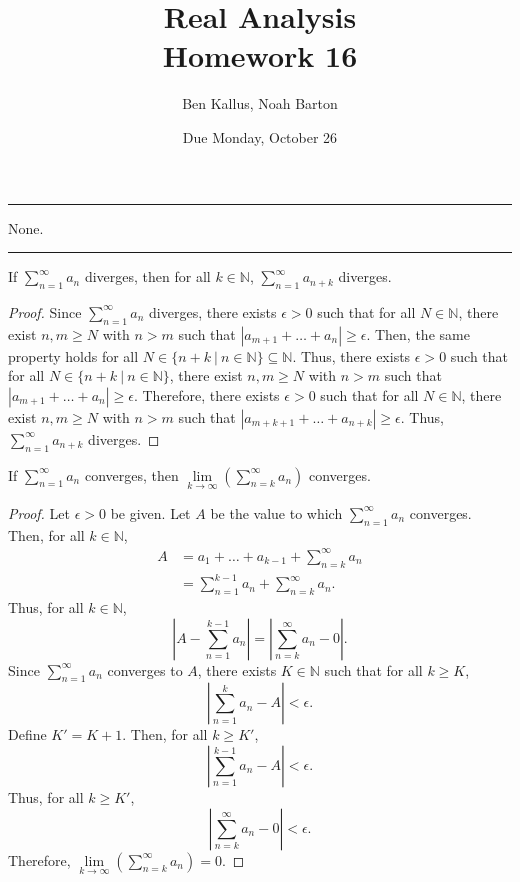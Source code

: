 \documentclass[12pt]{article}
\title{Real Analysis \\ Homework 16}
\author{Ben Kallus, Noah Barton}
\date{Due Monday, October 26}
\begin{document}
\pagecolor{black}
\color{white}
\maketitle

\hrule
\bigskip

 None.

\bigskip
\hrule
\bigskip

 If $\sum\limits_{n=1}^\infty a_n$ diverges, then for all $k \in \mathbb N$, $\sum\limits_{n=1}^\infty a_{n+k}$ diverges.
\begin{proof}
    Since $\sum\limits_{n=1}^\infty a_n$ diverges, there exists $\epsilon > 0$ such that for all $N \in \mathbb N$, there exist $n,m \geq N$ with $n > m$ such that $|a_{m+1} + \hdots + a_n| \geq \epsilon$. Then, the same property holds for all $N \in \{n+k~|~n \in \mathbb N\} \subseteq \mathbb N$. Thus, there exists $\epsilon > 0$ such that for all $N \in \{n+k~|~n \in \mathbb N\}$, there exist $n,m \geq N$ with $n > m$ such that $|a_{m+1} + \hdots + a_n| \geq \epsilon$. Therefore, there exists $\epsilon > 0$ such that for all $N \in \mathbb N$, there exist $n,m \geq N$ with $n > m$ such that $|a_{m+k+1} + \hdots + a_{n+k}| \geq \epsilon$. Thus, $\sum\limits_{n=1}^\infty a_{n+k}$ diverges.
\end{proof}

\newpage
{} If $\sum\limits_{n=1}^\infty a_n$ converges, then $\lim\limits_{k\to\infty} \left( \sum\limits_{n=k}^\infty a_n \right)$ converges.
\begin{proof}
    Let $\epsilon > 0$ be given. Let $A$ be the value to which $\sum\limits_{n=1}^\infty a_n$ converges. Then, for all $k \in \mathbb N$,
    \begin{align*}
        A &= a_1 + \hdots + a_{k-1} + \sum\limits_{n=k}^\infty a_n \\
          &= \sum\limits_{n=1}^{k-1} a_n + \sum\limits_{n=k}^\infty a_n.
    \end{align*}
    Thus, for all $k \in \mathbb N$, $$\left|A - \sum\limits_{n=1}^{k-1} a_n\right| = \left|\sum\limits_{n=k}^\infty a_n - 0\right|.$$ Since $\sum\limits_{n=1}^\infty a_n$ converges to $A$, there exists $K \in \mathbb N$ such that for all $k \geq K$, $$\left| \sum_{n=1}^k a_n - A\right| < \epsilon.$$
    Define $K' = K + 1$. Then, for all $k \geq K'$, $$\left| \sum_{n=1}^{k-1} a_n - A\right| < \epsilon.$$
    Thus, for all $k \geq K'$, $$\left|\sum\limits_{n=k}^\infty a_n - 0\right| < \epsilon.$$
    Therefore, $\lim\limits_{k\to\infty} \left( \sum\limits_{n=k}^\infty a_n \right) = 0$.
\end{proof}
    
\end{document}

